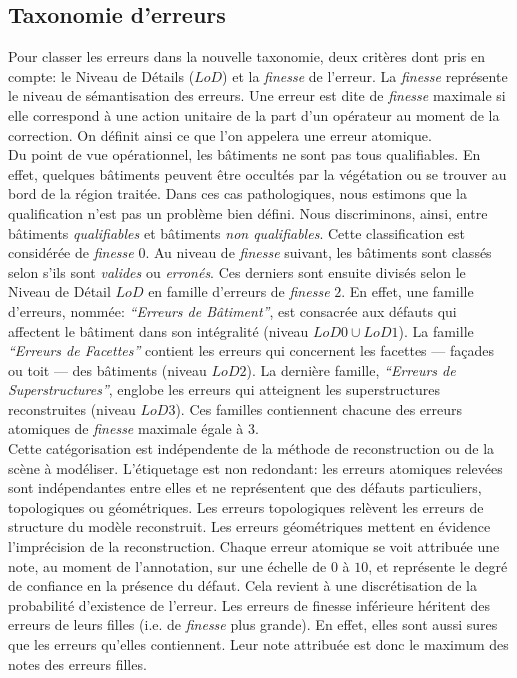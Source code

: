 \documentclass[a4paper,french]{article}
\begin{document}
    \subsection{Taxonomie d'erreurs}

    Pour classer les erreurs dans la nouvelle taxonomie, deux critères dont pris en compte: le Niveau de Détails ($LoD$) et la \emph{finesse} de l'erreur. La \emph{finesse} représente le niveau de sémantisation des erreurs. Une erreur est dite de \emph{finesse} maximale si elle correspond à une action unitaire de la part d'un opérateur au moment de la correction. On définit ainsi ce que l'on appelera une erreur atomique.\\
    Du point de vue opérationnel, les bâtiments ne sont pas tous qualifiables. En effet, quelques bâtiments peuvent être occultés par la végétation ou se trouver au bord de la région traitée. Dans ces cas pathologiques, nous estimons que la qualification n'est pas un problème bien défini. Nous discriminons, ainsi, entre bâtiments \emph{qualifiables} et bâtiments \emph{non qualifiables}. Cette classification est considérée de \emph{finesse} $0$. Au niveau de \emph{finesse} suivant, les bâtiments sont classés selon s'ils sont \emph{valides} ou \emph{erronés}. Ces derniers sont ensuite divisés selon le Niveau de Détail $LoD$ en famille d'erreurs de \emph{finesse} $2$. En effet, une famille d'erreurs, nommée: \emph{``Erreurs de Bâtiment''}, est consacrée aux défauts qui affectent le bâtiment dans son intégralité (niveau $LoD 0\cup LoD 1$). La famille \emph{``Erreurs de Facettes''} contient les erreurs qui concernent les facettes --- façades ou toit --- des bâtiments (niveau $LoD 2$). La dernière famille, \emph{``Erreurs de Superstructures''}, englobe les erreurs qui atteignent les superstructures reconstruites (niveau $LoD 3$). Ces familles contiennent chacune des erreurs atomiques de \emph{finesse} maximale égale à $3$.\\
    Cette catégorisation est indépendente de la méthode de reconstruction ou de la scène à modéliser. L'étiquetage est non redondant: les erreurs atomiques relevées sont indépendantes entre elles et ne représentent que des défauts particuliers, topologiques ou géométriques. Les erreurs topologiques relèvent les erreurs de structure du modèle reconstruit. Les erreurs géométriques mettent en évidence l'imprécision de la reconstruction. Chaque erreur atomique se voit attribuée une note, au moment de l'annotation, sur une échelle de $0$ à $10$, et représente le degré de confiance en la présence du défaut. Cela revient à une discrétisation de la probabilité d'existence de l'erreur. Les erreurs de finesse inférieure héritent des erreurs de leurs filles (i.e. de \emph{finesse} plus grande). En effet, elles sont aussi sures que les erreurs qu'elles contiennent. Leur note attribuée est donc le maximum des notes des erreurs filles.
\end{document}
